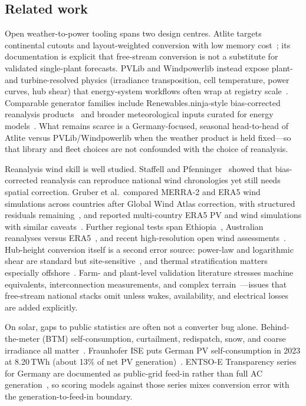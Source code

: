 \documentclass[preprint,12pt,number]{elsarticle}
\begin{document}
\subsection{Related work}
Open weather-to-power tooling spans two design centres.
Atlite targets continental cutouts and layout-weighted conversion with low memory cost~\citep{Hofmann2021}; its documentation is explicit that free-stream conversion is not a substitute for validated single-plant forecasts.
PVLib and Windpowerlib instead expose plant- and turbine-resolved physics (irradiance transposition, cell temperature, power curves, hub shear) that energy-system workflows often wrap at registry scale~\citep{pvlib2023,windpowerlib}.
Comparable generator families include Renewables.ninja-style bias-corrected reanalysis products~\citep{Staffell2016BiasCorrection} and broader meteorological inputs curated for energy models~\citep{Bloomfield2022}.
What remains scarce is a Germany-focused, seasonal head-to-head of Atlite versus PVLib/Windpowerlib when the weather product is held fixed---so that library and fleet choices are not confounded with the choice of reanalysis.

Reanalysis wind skill is well studied.
Staffell and Pfenninger~\citep{Staffell2016BiasCorrection} showed that bias-corrected reanalysis can reproduce national wind chronologies yet still needs spatial correction.
Gruber et al.\ compared MERRA-2 and ERA5 wind simulations across countries after Global Wind Atlas correction, with structured residuals remaining~\citep{Gruber2021GlobalWind,Gruber2019BrazilWind}, and reported multi-country ERA5 PV and wind simulations with similar caveats~\citep{Gruber2021MultiCountry}.
Further regional tests span Ethiopia~\citep{Nefabas2021EthiopianWind}, Australian reanalyses versus ERA5~\citep{Palmer2025Australia}, and recent high-resolution open wind assessments~\citep{PenaSanchez2026}.
Hub-height conversion itself is a second error source: power-law and logarithmic shear are standard but site-sensitive~\citep{Peterson1978Shear,Banuelos2010Extrapolation,Sumair2020CoastalExtrap,Theuer2020LidarExtrap}, and thermal stratification matters especially offshore~\citep{Lange2004SeaRoughness}.
Farm- and plant-level validation literature stresses machine equivalents, interconnection measurements, and complex terrain~\citep{Muljadi2010MachineEquivalent,Muljadi2008Validation,Quon2019Terrain,SCADAInterconnect2014}---issues that free-stream national stacks omit unless wakes, availability, and electrical losses are added explicitly.

On solar, gaps to public statistics are often not a converter bug alone.
Behind-the-meter (BTM) self-consumption, curtailment, redispatch, snow, and coarse irradiance all matter~\citep{Zech2024}.
Fraunhofer ISE puts German PV self-consumption in 2023 at 8.20\,TWh (about 13\% of net PV generation)~\citep{FraunhoferISE2025SelfConsumption}.
ENTSO-E Transparency series for Germany are documented as public-grid feed-in rather than full AC generation~\citep{ENTSOEActualGeneration}, so scoring models against those series mixes conversion error with the generation-to-feed-in boundary.
\end{document}
